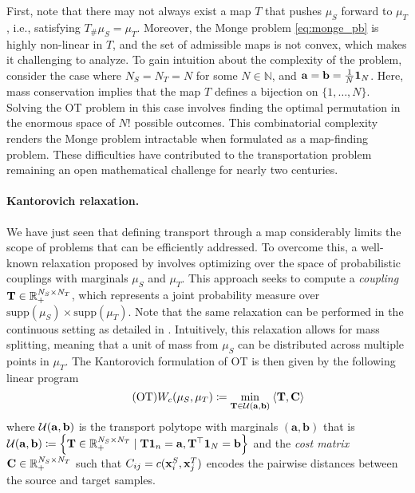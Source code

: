 First, note that there may not always exist a map \(T\) that pushes \(\mu_S\) forward to \(\mu_T\), i.e., satisfying \(T_{\#}\mu_S = \mu_T\). Moreover, the Monge problem \eqref{eq:monge_pb} is highly non-linear in \(T\), and the set of admissible maps is not convex, which makes it challenging to analyze. To gain intuition about the complexity of the problem, consider the case where \(N_S = N_T = N\) for some \(N \in \mathbb{N}\), and \({\mathbf{a}} = {\mathbf{b}} = \frac{1}{N} \mathbf{1}_N\). Here, mass conservation implies that the map \(T\) defines a bijection on \(\{1, \ldots, N\}\). Solving the OT problem in this case involves finding the optimal permutation in the enormous space of \(N!\) possible outcomes. This combinatorial complexity renders the Monge problem intractable when formulated as a map-finding problem. These difficulties have contributed to the transportation problem remaining an open mathematical challenge for nearly two centuries.


\paragraph{Kantorovich relaxation.}
We have just seen that defining transport through a map considerably limits the scope of problems that can be efficiently addressed. To overcome this, a well-known relaxation proposed by \citep{kantorovich1942translocation} involves optimizing over the space of probabilistic couplings with marginals \(\mu_S\) and \(\mu_T\). This approach seeks to compute a \emph{coupling} \({\mathbf{T}} \in \mathbb{R}_{+}^{N_S \times N_T}\), which represents a joint probability measure over \(\text{supp}(\mu_S) \times \text{supp}(\mu_T)\). Note that the same relaxation can be performed in the continuous setting as detailed in . Intuitively, this relaxation allows for mass splitting, meaning that a unit of mass from \(\mu_S\) can be distributed across multiple points in \(\mu_T\).
The Kantorovich formulation of OT is then given by the following linear program
\begin{equation}
    \tag{OT}
    \label{eq:OT}
    W_c(\mu_S, \mu_T) \coloneqq \min_{{\mathbf{T}} \in {\mathcal{U}}({\mathbf{a}}, {\mathbf{b}})} \: \langle {\mathbf{T}}, {\mathbf{C}} \rangle
\end{equation}
where ${\mathcal{U}}({\mathbf{a}}, {\mathbf{b}})$ is the transport polytope with marginals $(\bm{a}, \bm{b})$ that is ${\mathcal{U}}({\mathbf{a}}, {\mathbf{b}}) \coloneqq \left\{ {\mathbf{T}} \in \mathbb{R}_+^{N_S \times N_T} \mid {\mathbf{T}} \mathbf{1}_n = {\mathbf{a}}, {\mathbf{T}}^\top \mathbf{1}_N = {\mathbf{b}} \right\}$ and the \emph{cost matrix} $\mathbf{C} \in \mathbb{R}_+^{N_S \times N_T}$ such that $C_{ij} = c({\mathbf{x}}_i^S, {\mathbf{x}}_j^T)$ encodes the pairwise distances between the source and target samples. 

